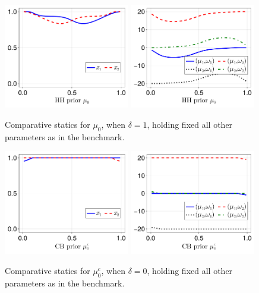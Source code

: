\documentclass[12pt,a4paper]{article}
\begin{document}
\begin{figure}[H]
\centering
\includegraphics[width=0.49\textwidth]{figures/V8/γ_10/fig_optimal_π_across_μ_0_ω_1_1_ω_2_-1_δ_1.0_.pdf}
\includegraphics[width=0.49\textwidth]{figures/V8/γ_10/fig_posterior_across_μ_0_ω_1_1_ω_2_-1_δ_1.0_.pdf}
\caption{Comparative statics for $\mu_0$, when $\delta=1$, holding fixed all other parameters as in the benchmark.}
\label{FigureA2}
\end{figure}

\begin{figure}[H]
\centering
\includegraphics[width=0.49\textwidth]{figures/V8/γ_10/fig_optimal_π_across_μ_0_c_ω_1_1_ω_2_-1_δ_0.0_.pdf}
\includegraphics[width=0.49\textwidth]{figures/V8/γ_10/fig_posterior_across_μ_0_c_ω_1_1_ω_2_-1_δ_0.0_.pdf}
\caption{Comparative statics for $\mu_0^c$, when $\delta=0$, holding fixed all other parameters as in the benchmark.}
\label{FigureA3}
\end{figure}
\end{document}
